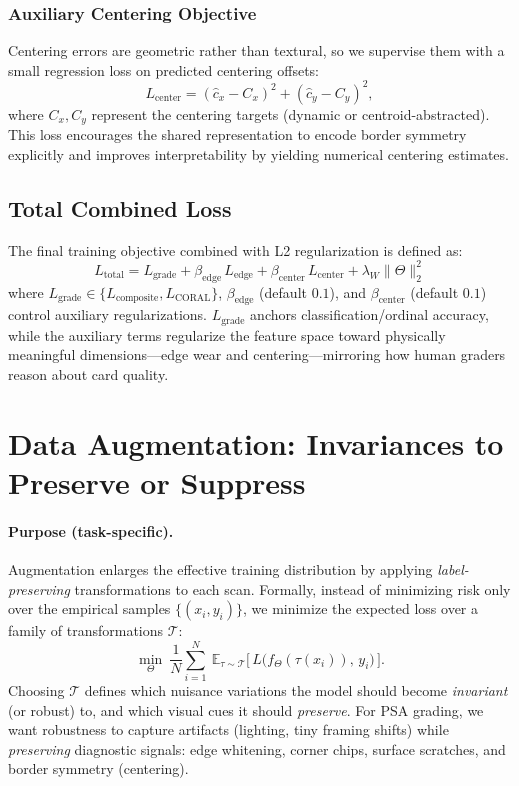 \documentclass[12pt]{article}
\begin{document}
\subsubsection{Auxiliary Centering Objective}
Centering errors are geometric rather than textural, so we supervise them with a small regression loss on predicted centering offsets:
\[
L_{\text{center}} = (\hat{c}_x - C_x)^2 + (\hat{c}_y - C_y)^2,
\]
where $C_x,C_y$ represent the centering targets (dynamic or centroid-abstracted).
This loss encourages the shared representation to encode border symmetry explicitly and improves interpretability by yielding numerical centering estimates.

\subsection{Total Combined Loss}
The final training objective combined with L2 regularization is defined as:
\[
\boxed{
L_{\text{total}} = L_{\text{grade}}
   + \beta_{\text{edge}}\,L_{\text{edge}}
   + \beta_{\text{center}}\,L_{\text{center}}
   + \lambda_W \|\Theta\|_2^2
}
\]
where $L_{\text{grade}} \in \{L_{\text{composite}}, L_{\text{CORAL}}\}$, $\beta_{\text{edge}}$ (default $0.1$), and $\beta_{\text{center}}$ (default $0.1$) control auxiliary regularizations.
$L_{\text{grade}}$ anchors classification/ordinal accuracy, while the auxiliary terms regularize the feature space toward physically meaningful dimensions---edge wear and centering---mirroring how human graders reason about card quality.



\section{Data Augmentation: Invariances to Preserve or Suppress}
\label{sec:augmentation}

\paragraph{Purpose (task-specific).}
Augmentation enlarges the effective training distribution by applying \emph{label-preserving} transformations to each scan.
Formally, instead of minimizing risk only over the empirical samples $\{(x_i,y_i)\}$, we minimize the expected loss over a family of transformations $\mathcal{T}$:
\[
\min_\Theta \ \frac{1}{N}\sum_{i=1}^N \ \mathbb{E}_{\tau\sim\mathcal{T}} \big[\, L\big(f_\Theta(\tau(x_i)),\, y_i\big) \,\big].
\]
Choosing $\mathcal{T}$ defines which nuisance variations the model should become \emph{invariant} (or robust) to, and which visual cues it should \emph{preserve}.
For PSA grading, we want robustness to capture artifacts (lighting, tiny framing shifts) while \emph{preserving} diagnostic signals: edge whitening, corner chips, surface scratches, and border symmetry (centering).
\end{document}
